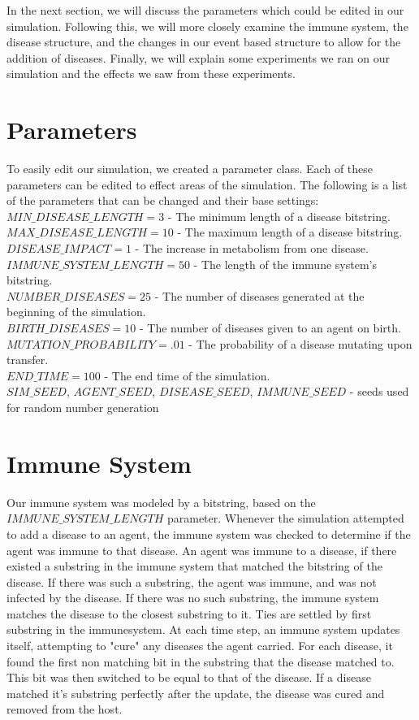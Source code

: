 \documentclass[12pt,a4paper]{article} %
\begin{document}
    In the next section, we will discuss the parameters which could be edited in our simulation. Following this, we will more closely examine the immune system, the disease structure, and the changes in our event based structure to allow for the addition of diseases. Finally, we will explain some experiments we ran on our simulation and the effects we saw from these experiments.
    
    \section{Parameters}
    To easily edit our simulation, we created a parameter class. Each of these parameters can be edited to effect areas of the simulation. The following is a list of the parameters that can be changed and their base settings:\\
    $MIN\_DISEASE\_LENGTH = 3$ - The minimum length of a disease bitstring.\\
    $MAX\_DISEASE\_LENGTH = 10$ - The maximum length of a disease bitstring.\\
    $DISEASE\_IMPACT = 1$ - The increase in metabolism from one disease.\\
    $IMMUNE\_SYSTEM\_LENGTH = 50$ - The length of the immune system's bitstring.\\
    $NUMBER\_DISEASES = 25$ - The number of diseases generated at the beginning of the simulation.\\
    $BIRTH\_DISEASES = 10$ - The number of diseases given to an agent on birth.\\
    $MUTATION\_PROBABILITY = .01$ - The probability of a disease mutating upon transfer.\\
    $END\_TIME = 100$ - The end time of the simulation. \\
    $SIM\_SEED$, $AGENT\_SEED$, $DISEASE\_SEED$, $IMMUNE\_SEED$ - seeds used for random number generation
    
    \section{Immune System}
    Our immune system was modeled by a bitstring, based on the $IMMUNE\_SYSTEM\_LENGTH$ parameter. Whenever the simulation attempted to add a disease to an agent, the immune system was checked to determine if the agent was immune to that disease. An agent was immune to a disease, if there existed a substring in the immune system that matched the bitstring of the disease. If there was such a substring, the agent was immune, and was not infected by the disease. If there was no such substring, the immune system matches the disease to the closest substring to it. Ties are settled by first substring in the immunesystem. At each time step, an immune system updates itself, attempting to "cure" any diseases the agent carried. For each disease, it found the first non matching bit in the substring that the disease matched to. This bit was then switched to be equal to that of the disease. If a disease matched it's substring perfectly after the update, the disease was cured and removed from the host.
    
\end{document}

